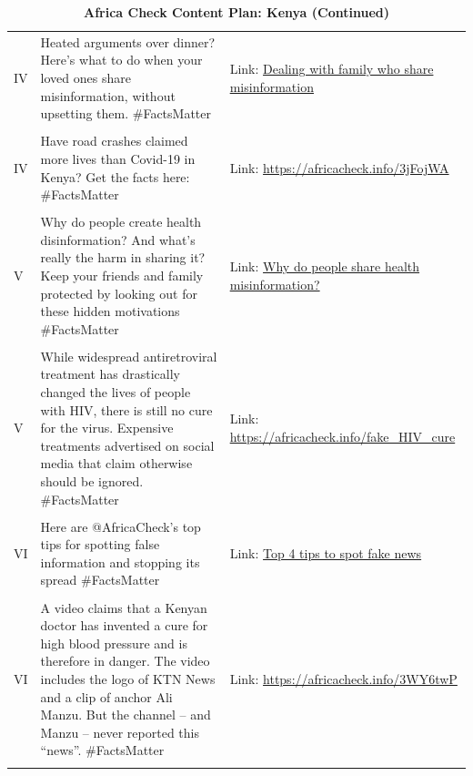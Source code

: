 	\begin{table}[ht]
		\centering
  \caption{\textbf{Africa Check Content Plan: Kenya (Continued)} \label{tab:KE_2}}
		\begin{tabular}{|p{1cm}|p{7cm}|p{5cm}|}
			\hline
   IV & Heated arguments over dinner? Here’s what to do when your loved ones share misinformation, without upsetting them. \#FactsMatter & Link: \href{https://www.dropbox.com/s/s702vzeb8sc39ij/Africa_Check_misinformation.mp4?dl=0}{Dealing with family who share misinformation} \\ &  &\\
        IV & Have road crashes claimed more lives than Covid-19 in Kenya? Get the facts here:  
        \#FactsMatter
 & Link: \url{ https://africacheck.info/3jFojWA } \\ &  &\\
 V & Why do people create health disinformation? And what’s really the harm in sharing it? Keep your friends and family protected by looking out for these hidden motivations \#FactsMatter & Link: \href{https://www.dropbox.com/s/v8voe5fqa4b1fr2/Africa_Check_covid.mp4?dl=0}{Why do people share health misinformation?} \\ &  &\\
 V & While widespread antiretroviral treatment has drastically changed the lives of people with HIV, there is still no cure for the virus. Expensive treatments advertised on social media that claim otherwise should be ignored.
 \#FactsMatter
 & Link: \url{https://africacheck.info/fake_HIV_cure} \\ &  &\\
 VI & Here are @AfricaCheck’s top tips for spotting false information and stopping its spread
 \#FactsMatter & Link: \href{https://www.dropbox.com/s/wl2mzgkvqnw47dl/Africa_Check_youtube_fakenews.mp4?dl=0}{Top 4 tips to spot fake news} \\ &  &\\
 VI & A video claims that a Kenyan doctor has invented a cure for high blood pressure and is therefore in danger. The video includes the logo of KTN News and a clip of anchor Ali Manzu. But the channel – and Manzu – never reported this “news”.
 \#FactsMatter
 & Link: \url{https://africacheck.info/3WY6twP} \\ &  &\\
\hline
		\end{tabular}
\end{table}


